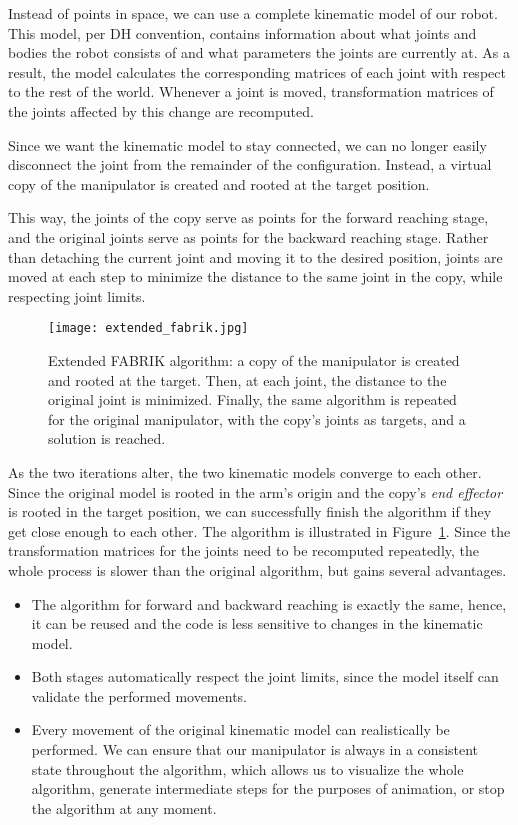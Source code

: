 Instead of points in space, we can use a complete kinematic model of our robot. This model, per DH convention, contains information about what joints and bodies the robot consists of and what parameters the joints are currently at. As a result, the model calculates the corresponding matrices of each joint with respect to the rest of the world. Whenever a joint is moved, transformation matrices of the joints affected by this change are recomputed.

Since we want the kinematic model to stay connected, we can no longer easily disconnect the joint from the remainder of the configuration. Instead, a virtual copy of the manipulator is created and rooted at the target position.

This way, the joints of the copy serve as points for the forward reaching stage, and the original joints serve as points for the backward reaching stage. Rather than detaching the current joint and moving it to the desired position, joints are moved at each step to minimize the distance to the same joint in the copy, while respecting joint limits.

\begin{figure}
  \centering
  \texttt{[image: extended\_fabrik.jpg]}
  \caption{Extended FABRIK algorithm: a copy of the manipulator is created and rooted at the target. Then, at each joint, the distance to the original joint is minimized. Finally, the same algorithm is repeated for the original manipulator, with the copy's joints as targets, and a solution is reached.}\label{fig:ext_fab}
\end{figure}

As the two iterations alter, the two kinematic models converge to each other. Since the original model is rooted in the arm's origin and the copy's \textit{end effector} is rooted in the target position, we can successfully finish the algorithm if they get close enough to each other. The algorithm is illustrated in Figure~\ref{fig:ext_fab}. Since the transformation matrices for the joints need to be recomputed repeatedly, the whole process is slower than the original algorithm, but gains several advantages.

\begin{itemize}
  \item The algorithm for forward and backward reaching is exactly the same, hence, it can be reused and the code is less sensitive to changes in the kinematic model.
  \item Both stages automatically respect the joint limits, since the model itself can validate the performed movements.
  \item Every movement of the original kinematic model can realistically be performed. We can ensure that our manipulator is always in a consistent state throughout the algorithm, which allows us to visualize the whole algorithm, generate intermediate steps for the purposes of animation, or stop the algorithm at any moment.
\end{itemize}

